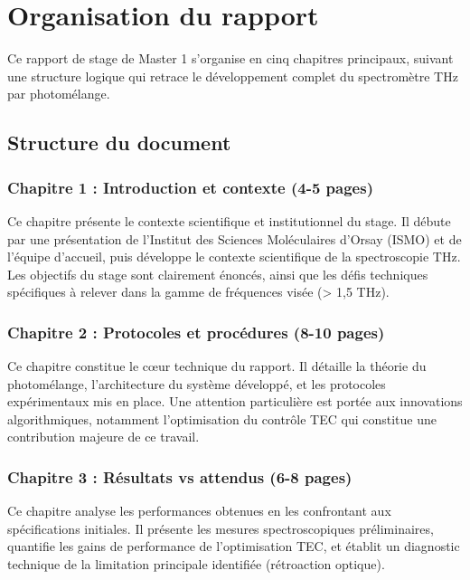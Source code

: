 
\chapter*{Organisation du rapport}

Ce rapport de stage de Master 1 s'organise en cinq chapitres principaux, suivant une structure logique qui retrace le développement complet du spectromètre THz par photomélange.

\section*{Structure du document}

\subsection*{Chapitre 1 : Introduction et contexte (4-5 pages)}
Ce chapitre présente le contexte scientifique et institutionnel du stage. Il débute par une présentation de l'Institut des Sciences Moléculaires d'Orsay (ISMO) et de l'équipe d'accueil, puis développe le contexte scientifique de la spectroscopie THz. Les objectifs du stage sont clairement énoncés, ainsi que les défis techniques spécifiques à relever dans la gamme de fréquences visée (> 1,5 THz).

\subsection*{Chapitre 2 : Protocoles et procédures (8-10 pages)}
Ce chapitre constitue le cœur technique du rapport. Il détaille la théorie du photomélange, l'architecture du système développé, et les protocoles expérimentaux mis en place. Une attention particulière est portée aux innovations algorithmiques, notamment l'optimisation du contrôle TEC qui constitue une contribution majeure de ce travail.

\subsection*{Chapitre 3 : Résultats vs attendus (6-8 pages)}
Ce chapitre analyse les performances obtenues en les confrontant aux spécifications initiales. Il présente les mesures spectroscopiques préliminaires, quantifie les gains de performance de l'optimisation TEC, et établit un diagnostic technique de la limitation principale identifiée (rétroaction optique).

